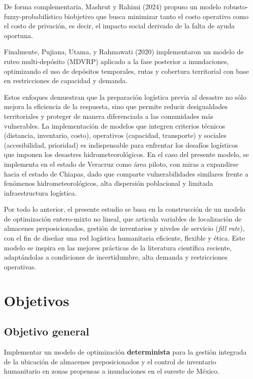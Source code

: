 \documentclass[
  spanish,
  us-letterpaper,
]{scrreprt}
\numberwithin{equation}{section}
\begin{document}
De forma complementaria, Mashrut y Rahimi (2024) propuso un modelo
robusto-fuzzy-probabilístico biobjetivo que busca minimizar tanto el
costo operativo como el costo de privación, es decir, el impacto social
derivado de la falta de ayuda oportuna.

Finalmente, Pujiana, Utama, y Rahmawati (2020) implementaron un modelo
de ruteo multi-depósito (MDVRP) aplicado a la fase posterior a
inundaciones, optimizando el uso de depósitos temporales, rutas y
cobertura territorial con base en restricciones de capacidad y demanda.

Estos enfoques demuestran que la preparación logística previa al
desastre no sólo mejora la eficiencia de la respuesta, sino que permite
reducir desigualdades territoriales y proteger de manera diferenciada a
las comunidades más vulnerables. La implementación de modelos que
integren criterios técnicos (distancia, inventario, costo), operativos
(capacidad, transporte) y sociales (accesibilidad, prioridad) es
indispensable para enfrentar los desafíos logísticos que imponen los
desastres hidrometeorológicos. En el caso del presente modelo, se
implementa en el estado de Veracruz como área piloto, con miras a
expandirse hacia el estado de Chiapas, dado que comparte
vulnerabilidades similares frente a fenómenos hidrometeorológicos, alta
dispersión poblacional y limitada infraestructura logística.

Por todo lo anterior, el presente estudio se basa en la construcción de
un modelo de optimización entero‑mixto no lineal, que articula variables
de localización de almacenes preposicionados, gestión de inventarios y
niveles de servicio (\emph{fill rate}), con el fin de diseñar una red
logística humanitaria eficiente, flexible y ética. Este modelo se
inspira en las mejores prácticas de la literatura científica reciente,
adaptándolas a condiciones de incertidumbre, alta demanda y
restricciones operativas.


\chapter{Objetivos}\label{objetivos}

\section{\texorpdfstring{\textbf{Objetivo
general}}{Objetivo general}}\label{objetivo-general}

Implementar un modelo de optimización \textbf{determinista} para la
gestión integrada de la ubicación de almacenes preposicionados y el
control de inventario humanitario en zonas propensas a inundaciones en
el sureste de México.
\end{document}
